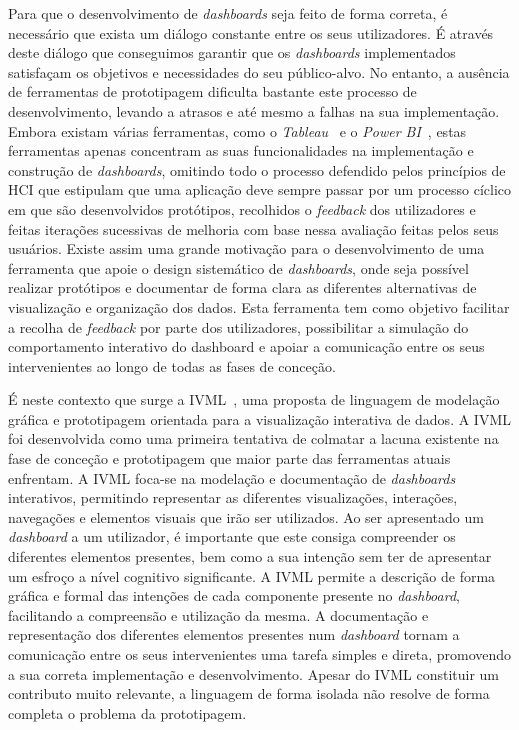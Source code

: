 Para que o desenvolvimento de \textit{dashboards} seja feito de forma correta, é necessário que exista um diálogo constante entre os seus utilizadores. É através deste diálogo que conseguimos garantir que os \textit{dashboards} implementados satisfaçam os objetivos e necessidades do seu público-alvo. No entanto, a ausência de ferramentas de prototipagem dificulta bastante este processo de desenvolvimento, levando a atrasos e até mesmo a falhas na sua implementação. Embora existam várias ferramentas, como o \textit{Tableau}~\cite{tableau} e o \textit{Power BI}~\cite{powerBI}, estas ferramentas apenas concentram as suas funcionalidades na implementação e construção de \textit{dashboards}, omitindo todo o processo defendido pelos princípios de \gls{HCI} que estipulam que uma aplicação deve sempre passar por um processo cíclico em que são desenvolvidos protótipos, recolhidos o \textit{feedback} dos utilizadores e feitas iterações sucessivas de melhoria com base nessa avaliação feitas pelos seus usuários. Existe assim uma grande motivação para o desenvolvimento de uma ferramenta que apoie o design sistemático de \textit{dashboards}, onde seja possível realizar protótipos e documentar de forma clara as diferentes alternativas de visualização e organização dos dados. Esta ferramenta tem como objetivo facilitar a recolha de \textit{feedback} por parte dos utilizadores, possibilitar a simulação do comportamento interativo do dashboard e apoiar a comunicação entre os seus intervenientes ao longo de todas as fases de conceção.

É neste contexto que surge a \gls{IVML}~\cite{Ferreira2023IVML}, uma proposta de linguagem de modelação gráfica e prototipagem orientada para a visualização interativa de dados. A \gls{IVML} foi desenvolvida como uma primeira tentativa de colmatar a lacuna existente na fase de conceção e prototipagem que maior parte das ferramentas atuais enfrentam. A \gls{IVML} foca-se na modelação e documentação de \textit{dashboards} interativos, permitindo representar as diferentes visualizações, interações, navegações e elementos visuais que irão ser utilizados. Ao ser apresentado um \textit{dashboard} a um utilizador, é importante que este consiga compreender os diferentes elementos presentes, bem como a sua intenção sem ter de apresentar um esfroço a nível cognitivo significante. A \gls{IVML} permite a descrição de forma gráfica e formal das intenções de cada componente presente no \textit{dashboard}, facilitando a compreensão e utilização da mesma. A documentação e representação dos diferentes elementos presentes num \textit{dashboard} tornam a comunicação entre os seus intervenientes uma tarefa simples e direta, promovendo a sua correta implementação e desenvolvimento. Apesar do \gls{IVML} constituir um contributo muito relevante, a linguagem de forma isolada não resolve de forma completa o problema da prototipagem.

